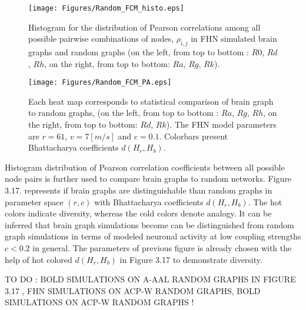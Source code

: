 \begin{figure}[htbp]
 
  \centering
	 \texttt{[image: Figures/Random\_FCM\_histo.eps]}
  \caption[Histogram Comparison, FCM]{Histogram for the distribution of Pearson correlations among all possible pairwise combinations of nodes, $\rho_{i,j}$ in FHN simulated brain graphs and random graphs (on the left, from top to bottom : $R0$, $Rd$, $Rh$, on the right, from top to bottom: $Ra$, $Rg$, $Rk$). } 
    \label{fig:Histogram Comparison, FCM}
 	
\end{figure}  

\begin{figure}[htbp]
 
  \centering
	 \texttt{[image: Figures/Random\_FCM\_PA.eps]}
  \caption[Random Graph Comparison, FCM]{Each heat map corresponds to statistical comparison of brain graph to random graphs, (on the left, from top to bottom : $Ra$, $Rg$, $Rh$, on the right, from top to bottom: $Rd$, $Rk$). The FHN model parameters are $r=61$, $v=7[m/s]$ and $c=0.1$. Colorbars present Bhattacharya coefficients $d(H_r, H_b)$. } 
    \label{fig:Random Graph Comparison, FCM}
 	
\end{figure}  

Histogram distribution of Pearson correlation coefficients between all possible node pairs is further used to compare brain graphs to random networks. Figure 3.17. represents if brain graphs are distinguishable than random graphs in parameter space $(r,c)$ with Bhattacharya coefficients $d(H_r, H_b)$. The hot colors indicate diversity, whereas the cold colors denote analogy. It can be inferred that brain graph simulations become can be distinguished from random graph simulations in terms of modeled neuronal activity at low coupling strengths $c<0.2$ in general.   The parameters of previous figure is already chosen with the help of hot colored $d(H_r, H_b)$ in Figure 3.17 to demonstrate diversity.


TO DO : BOLD SIMULATIONS ON A-AAL RANDOM GRAPHS IN FIGURE 3.17 , FHN SIMULATIONS ON ACP-W RANDOM GRAPHS, BOLD SIMULATIONS ON ACP-W RANDOM GRAPHS !



